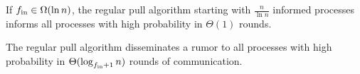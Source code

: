 
  \begin{corollary}
 If $f_\text{in}\in\Omega(\ln n)$, the regular pull algorithm starting with $\frac{n}{\ln n}$ informed processes informs all processes with high probability in $\Theta(1)$ rounds.
  \end{corollary}

  

\begin{theorem}
  \label{thm:pull}
    The regular pull algorithm disseminates a rumor to all processes with high probability in $\Theta(\log_{f_\text{in} + 1} n)$ rounds of communication.
\end{theorem}

